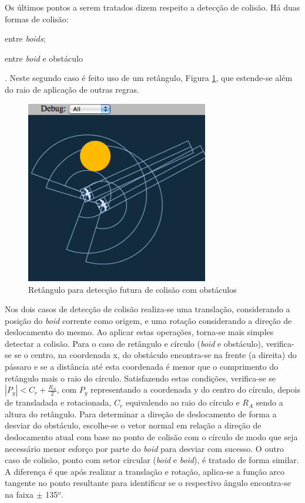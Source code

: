 \documentclass[12pt]{article}
\begin{document}
Os últimos pontos a serem tratados dizem respeito a detecção de
colisão. Há duas formas de colisão: \begin{inparaenum}[(1)] \item
  entre \textit{boids}; \item entre
\textit{boid} e obstáculo\end{inparaenum}. Neste segundo caso é feito
uso de um retângulo, Figura \ref{screen3}, que estende-se além do
raio de aplicação de outras regras.

\begin{figure}[ht!]
  \centering
  \includegraphics[height=8cm]{figs/avoidobst.png}
  \caption{Retângulo para detecção futura de colisão com obstáculos \label{screen3}}
\end{figure}

Nos dois casos de detecção de colisão realiza-se uma translação,
considerando a posição do \textit{boid} corrente como origem, e uma
rotação considerando a direção de deslocamento do mesmo. Ao aplicar estas
operações, torna-se mais simples detectar a colisão. Para o caso de
retângulo e círculo (\textit{boid} e obstáculo), verifica-se se o centro,
na coordenada x,
do obstáculo encontra-se na frente (a direita) do pássaro e se a
distância até esta coordenada é menor que o comprimento do retângulo mais o
raio do círculo. Satisfazendo estas condições, verifica-se se
$|P_y| < C_r + \frac{R_A}{2}$, com $P_y$ representando a coordenada y
do centro do 
círculo, depois de transladada e rotacionada, $C_r$ equivalendo ao
raio do círculo e $R_A$ sendo a altura do retângulo. Para determinar a direção de deslocamento de forma a
desviar do obstáculo, escolhe-se o vetor normal em relação a direção de
deslocamento atual com base no ponto de colisão com o círculo de modo
que seja necessário menor esforço por parte do \textit{boid} para
desviar com sucesso. O outro caso de colisão, ponto com setor circular
(\textit{boid} e \textit{boid}), é tratado de forma similar. A
diferença é que após realizar a translação e rotação, aplica-se a
função arco tangente no ponto resultante para identificar se o
respectivo ângulo encontra-se na faixa $\pm$ 135$^o$.
\end{document}
